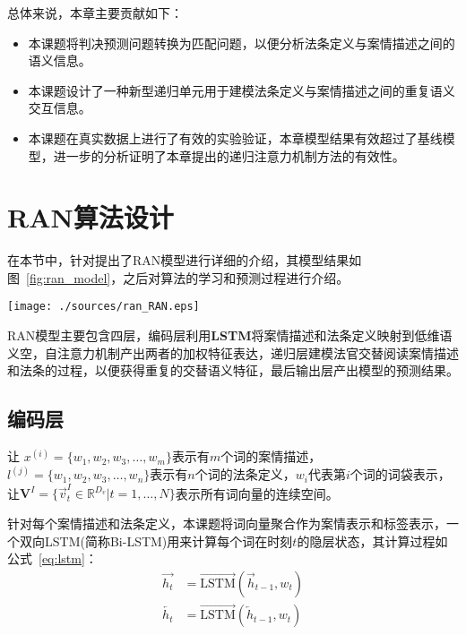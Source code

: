 总体来说，本章主要贡献如下：
\begin{itemize}
    \item 本课题将判决预测问题转换为匹配问题，以便分析法条定义与案情描述之间的语义信息。
    \item 本课题设计了一种新型递归单元用于建模法条定义与案情描述之间的重复语义交互信息。
    \item 本课题在真实数据上进行了有效的实验验证，本章模型结果有效超过了基线模型，进一步的分析证明了本章提出的递归注意力机制方法的有效性。
\end{itemize}

\section{RAN算法设计}
\label{sec:ran_algori}

在本节中，针对提出了RAN模型进行详细的介绍，其模型结果如图~\ref{fig:ran_model}，之后对算法的学习和预测过程进行介绍。
\begin{figure*}[htbp]
    \centering
    \texttt{[image: ./sources/ran\_RAN.eps]}
    \vspace{-10pt}
    \caption{\label{fig:ran_model} 递归注意力网络(RAN)模型结构图 }
    \vspace{-5pt}
\end{figure*}

RAN模型主要包含四层，编码层利用\textbf{LSTM}将案情描述和法条定义映射到低维语义空，自注意力机制产出两者的加权特征表达，递归层建模法官交替阅读案情描述和法条的过程，以便获得重复的交替语义特征，最后输出层产出模型的预测结果。

\subsection{编码层}
让 $x^{(i)} = {\{w_1, w_2, w_3, \dots, w_m\}}$表示有$m$个词的案情描述， $l^{(j)} = {\{w_1, w_2, w_3, \dots, w_n\}}$表示有$n$个词的法条定义，$w_i$代表第$i$个词的词袋表示，让$\textbf{V}^I=\{\vec{v}^I_t\in \mathbb{R}^{D_v}|t=1,\dots,N\}$表示所有词向量的连续空间。

针对每个案情描述和法条定义，本课题将词向量聚合作为案情表示和标签表示，一个双向LSTM(简称Bi-LSTM)用来计算每个词在时刻$t$的隐层状态，其计算过程如公式~\ref{eq:lstm}：
\begin{equation}\label{eq:lstm}
    \begin{aligned}
        \overrightarrow{h_t}&=\overrightarrow{\text{LSTM}}(\overrightarrow{h}_{t-1}, w_t)\\
        \overleftarrow{h_t}&=\overrightarrow{\text{LSTM}}(\overleftarrow{h}_{t-1}, w_t)\\
    \end{aligned}
\end{equation}

